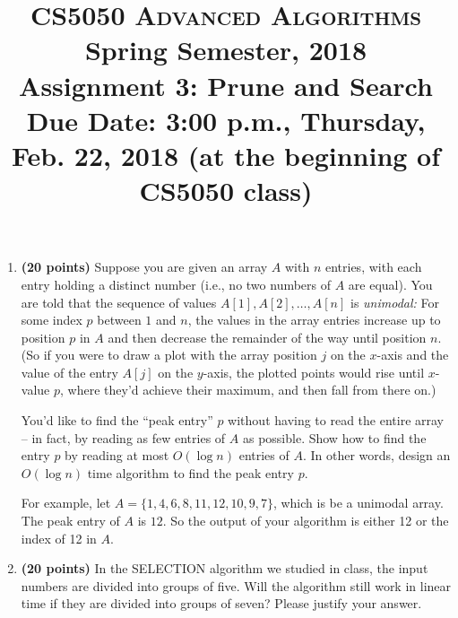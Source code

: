 \documentclass[11pt]{article}
\begin{document}
\baselineskip=14.0pt

\title{CS5050 \textsc{Advanced Algorithms}
\\{\Large Spring Semester, 2018}
\\ Assignment 3: Prune and Search
\\ {\large {\bf Due Date: 3:00 p.m.}, Thursday, Feb. 22, 2018 ({\bf at the beginning of CS5050 class})}}
\date{}


\maketitle

\vspace{-0.7in}


\begin{enumerate}

\item
{\bf (20 points)}
Suppose you are given an array $A$ with $n$ entries, with each entry
holding a distinct number (i.e., no two numbers of $A$ are
		equal). You are told that the sequence of
		values $A[1], A[2], \ldots, A[n]$ is {\em unimodal:} For some
		index $p$ between $1$ and $n$, the values in the array entries
		increase up to position $p$ in $A$ and then decrease the
		remainder of the way until position $n$. (So if you were to
		draw a plot with the array position $j$ on the $x$-axis and
		the value of the entry $A[j]$ on the $y$-axis, the plotted
		points would rise until $x$-value $p$, where they'd achieve
		their maximum, and then fall from there on.)


You'd like to find the ``peak entry'' $p$ without having to read the entire array -- in fact, by reading as few entries of $A$ as possible. Show how to find
the entry $p$ by reading at most $O(\log n)$ entries of $A$. In other words, design an $O(\log n)$ time algorithm to find the peak entry $p$.

For example, let $A=\{1, 4, 6, 8, 11, 12, 10, 9, 7\}$, which is be a unimodal array. The peak entry of $A$ is $12$. So the output of your algorithm is either 12 or the index of 12 in $A$.


\item
{\bf (20 points)}
In the SELECTION algorithm we studied in class, the input numbers are divided into groups of five. Will the algorithm still work in linear time if they are divided into groups of seven? Please justify your answer.




\end{enumerate}
\end{document}
